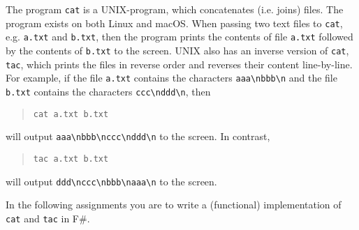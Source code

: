 The program \lstinline[language=console]{cat} is a UNIX-program, which concatenates (i.e. joins) files. The program exists on both Linux and macOS. When passing two text files to \lstinline[language=console]{cat}, e.g. \lstinline[language=console]{a.txt} and \lstinline[language=console]{b.txt}, then the program prints the contents of file \lstinline[language=console]{a.txt} followed by the contents of \lstinline[language=console]{b.txt} to the screen. UNIX also has an inverse version of \texttt{cat}, \texttt{tac}, which prints the files in reverse order and reverses their content line-by-line. For example, if the file \lstinline[language=console]{a.txt} contains the characters \lstinline[language=console]{aaa\nbbb\n} and the file \lstinline[language=console]{b.txt} contains the characters \lstinline[language=console]{ccc\nddd\n}, then
\begin{quote}
\lstinline[language=console]{cat a.txt b.txt}
\end{quote}
will output \lstinline[language=console]{aaa\nbbb\nccc\nddd\n} to the screen. In contrast,
\begin{quote}
\lstinline[language=console]{tac a.txt b.txt}
\end{quote}
will output \lstinline[language=console]{ddd\nccc\nbbb\naaa\n} to the screen.

In the following assignments you are to write a (functional) implementation of \lstinline[language=console]{cat} and \lstinline[language=console]{tac} in F\#.
